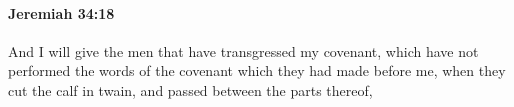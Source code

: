 
		\paragraph{Jeremiah 34:18} %
			\label{JEREMIAH-34-18}

			And I will give the men that have transgressed my covenant, which have not performed the words of the covenant which they had made before me, when they cut the calf in twain, and passed between the parts thereof,


